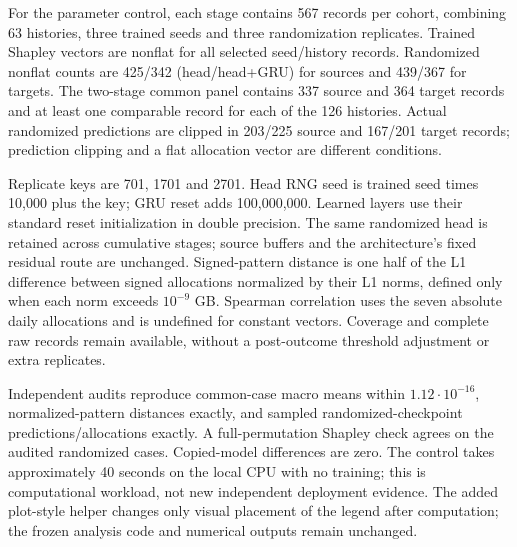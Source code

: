 \documentclass[conference]{IEEEtran}
\begin{document}
For the parameter control, each stage contains 567 records per cohort, combining 63 histories, three trained seeds and three randomization replicates. Trained Shapley vectors are nonflat for all selected seed/history records. Randomized nonflat counts are 425/342 (head/head+GRU) for sources and 439/367 for targets. The two-stage common panel contains 337 source and 364 target records and at least one comparable record for each of the 126 histories. Actual randomized predictions are clipped in 203/225 source and 167/201 target records; prediction clipping and a flat allocation vector are different conditions.

Replicate keys are 701, 1701 and 2701. Head RNG seed is trained seed times 10,000 plus the key; GRU reset adds 100,000,000. Learned layers use their standard reset initialization in double precision. The same randomized head is retained across cumulative stages; source buffers and the architecture's fixed residual route are unchanged. Signed-pattern distance is one half of the L1 difference between signed allocations normalized by their L1 norms, defined only when each norm exceeds $10^{-9}$ GB. Spearman correlation uses the seven absolute daily allocations and is undefined for constant vectors. Coverage and complete raw records remain available, without a post-outcome threshold adjustment or extra replicates.

Independent audits reproduce common-case macro means within $1.12\cdot10^{-16}$, normalized-pattern distances exactly, and sampled randomized-checkpoint predictions/allocations exactly. A full-permutation Shapley check agrees on the audited randomized cases. Copied-model differences are zero. The control takes approximately 40 seconds on the local CPU with no training; this is computational workload, not new independent deployment evidence. The added plot-style helper changes only visual placement of the legend after computation; the frozen analysis code and numerical outputs remain unchanged.
\end{document}
